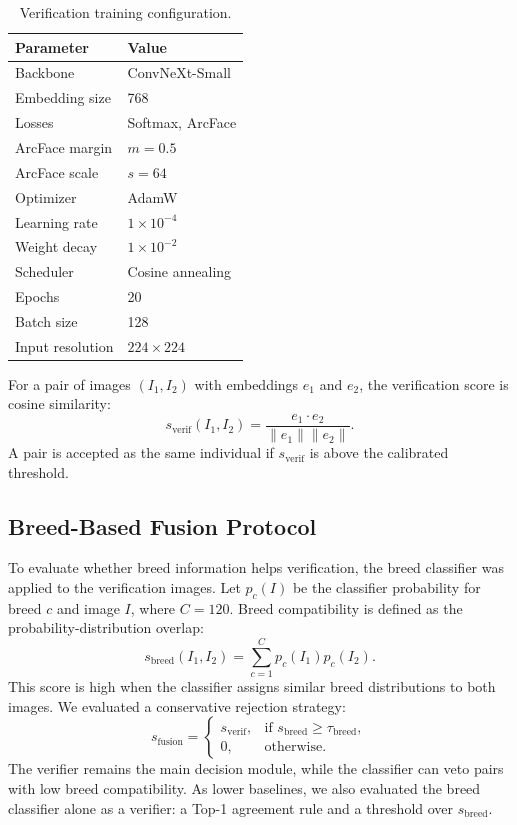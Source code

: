 \documentclass[conference]{IEEEtran}
\begin{document}
\begin{table}[t]
\centering
\caption{Verification training configuration.}
\label{tab:verification_hparams}
\begin{tabular}{ll}
\toprule
Parameter & Value \\
\midrule
Backbone & ConvNeXt-Small \\
Embedding size & 768 \\
Losses & Softmax, ArcFace \\
ArcFace margin & $m=0.5$ \\
ArcFace scale & $s=64$ \\
Optimizer & AdamW \\
Learning rate & $1 \times 10^{-4}$ \\
Weight decay & $1 \times 10^{-2}$ \\
Scheduler & Cosine annealing \\
Epochs & 20 \\
Batch size & 128 \\
Input resolution & $224 \times 224$ \\
\bottomrule
\end{tabular}
\end{table}

For a pair of images $(I_1, I_2)$ with embeddings $e_1$ and $e_2$, the verification score is cosine similarity:
\begin{equation}
    s_{\mathrm{verif}}(I_1,I_2) = \frac{e_1 \cdot e_2}{\|e_1\|\|e_2\|}.
\end{equation}
A pair is accepted as the same individual if $s_{\mathrm{verif}}$ is above the calibrated threshold.

\subsection{Breed-Based Fusion Protocol}

To evaluate whether breed information helps verification, the breed classifier was applied to the verification images. Let $p_c(I)$ be the classifier probability for breed $c$ and image $I$, where $C=120$. Breed compatibility is defined as the probability-distribution overlap:
\begin{equation}
    s_{\mathrm{breed}}(I_1,I_2) = \sum_{c=1}^{C} p_c(I_1)p_c(I_2).
\end{equation}
This score is high when the classifier assigns similar breed distributions to both images. We evaluated a conservative rejection strategy:
\begin{equation}
    s_{\mathrm{fusion}} =
    \begin{cases}
        s_{\mathrm{verif}}, & \text{if } s_{\mathrm{breed}} \geq \tau_{\mathrm{breed}},\\
        0, & \text{otherwise.}
    \end{cases}
\end{equation}
The verifier remains the main decision module, while the classifier can veto pairs with low breed compatibility. As lower baselines, we also evaluated the breed classifier alone as a verifier: a Top-1 agreement rule and a threshold over $s_{\mathrm{breed}}$.
\end{document}
